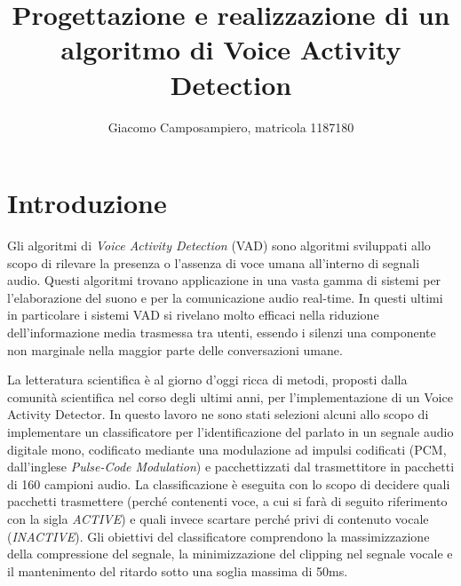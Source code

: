 \documentclass[10pt,twocolumn]{article}
\title{\textbf{Progettazione e realizzazione di un algoritmo di Voice Activity Detection}}
\author{Giacomo Camposampiero, matricola 1187180}
\begin{document}
\maketitle

\section{Introduzione}
{Gli algoritmi di \textit{Voice Activity Detection} (VAD) sono algoritmi sviluppati allo scopo di rilevare la
presenza o l'assenza di voce umana all'interno di segnali audio. Questi algoritmi trovano applicazione in una vasta gamma di sistemi per l'elaborazione del suono e per la comunicazione audio real-time. In questi ultimi in particolare i sistemi VAD si rivelano molto efficaci nella riduzione dell'informazione media trasmessa tra utenti, essendo i silenzi una componente non marginale nella maggior parte delle conversazioni umane.

\vspace{0.1cm}
La letteratura scientifica è al giorno d'oggi ricca di metodi, proposti dalla comunità scientifica nel corso
degli ultimi anni, per l'implementazione di un Voice Activity Detector. 
In questo lavoro ne sono stati selezioni alcuni allo scopo di implementare un classificatore per
l'identificazione del parlato in un segnale audio digitale mono, codificato mediante una modulazione ad impulsi
codificati (PCM, dall'inglese \textit{Pulse-Code Modulation}) e pacchettizzati dal trasmettitore in pacchetti di
160 campioni audio. La classificazione è eseguita con lo scopo di decidere quali pacchetti trasmettere
(perché contenenti voce, a cui si farà di seguito riferimento con la sigla \textsl{ACTIVE}) e quali invece
scartare perché privi di contenuto vocale (\textsl{INACTIVE}). 
Gli obiettivi del classificatore comprendono la massimizzazione della compressione del
segnale, la minimizzazione del clipping nel segnale vocale e il mantenimento del ritardo sotto una soglia
massima di 50ms. 

}
\end{document}
